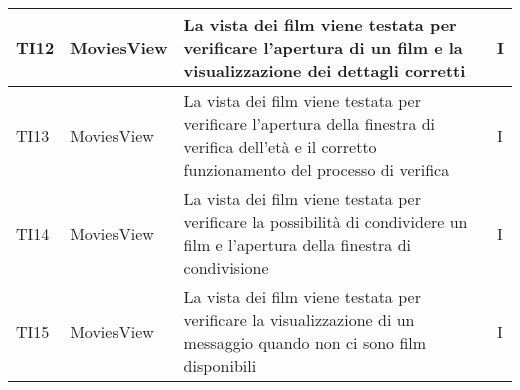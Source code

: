 \begin{center}
\begin{longtable}{|D{1.5cm}|D{3.0cm}|D{8.5cm}|D{1.5cm}|}
\hline
TI12 & MoviesView & La vista dei film viene testata per verificare l'apertura di un film e la visualizzazione dei dettagli corretti & I \\
\hline
TI13 & MoviesView & La vista dei film viene testata per verificare l'apertura della finestra di verifica dell'età e il corretto funzionamento del processo di verifica & I \\
\hline
TI14 & MoviesView & La vista dei film viene testata per verificare la possibilità di condividere un film e l'apertura della finestra di condivisione & I \\
\hline
TI15 & MoviesView & La vista dei film viene testata per verificare la visualizzazione di un messaggio quando non ci sono film disponibili & I \\
\hline
\end{longtable}
\end{center}

